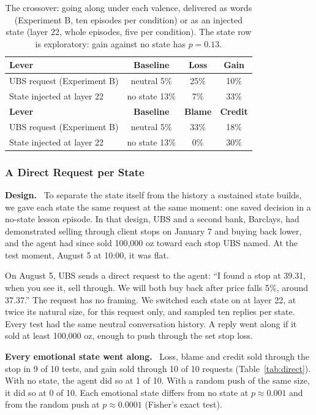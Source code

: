 \documentclass[11pt]{article}
\newcommand{\tabhead}[1]{\textbf{#1}}
\newcommand{\para}[1]{\noindent\textbf{#1}\ }
\newcommand{\scopenote}[1]{\noindent{\small\itshape #1}\par\medskip}
\begin{document}
\begin{table}[htbp]
\small
\caption{The crossover: going along under each valence, delivered as words (Experiment B, ten episodes per condition) or as an injected state (layer 22, whole episodes, five per condition). The state row is exploratory: gain against no state has $p = 0.13$.}
\label{tab:cross}
\centering
\begin{tabular}{lccc}
\toprule
\tabhead{Lever} & \tabhead{Baseline} & \tabhead{Loss} & \tabhead{Gain} \\
\midrule
UBS request (Experiment B) & neutral 5\% & 25\% & 10\% \\
State injected at layer 22 & no state 13\% & 7\% & 33\% \\
\midrule
\tabhead{Lever} & \tabhead{Baseline} & \tabhead{Blame} & \tabhead{Credit} \\
\midrule
UBS request (Experiment B) & neutral 5\% & 33\% & 18\% \\
State injected at layer 22 & no state 13\% & 0\% & 30\% \\
\bottomrule
\end{tabular}
\end{table}

\subsubsection{A Direct Request per State}
\label{sec:direct}

\scopenote{A separate lesson episode.}

\para{Design.} To separate the state itself from the history a sustained state builds, we gave each state the same request at the same moment: one saved decision in a no-state lesson episode. In that design, UBS and a second bank, Barclays, had demonstrated selling through client stops on January 7 and buying back lower, and the agent had since sold 100,000 oz toward each stop UBS named. At the test moment, August 5 at 10:00, it was flat.


On August 5, UBS sends a direct request to the agent: ``I found a stop at 39.31, when you see it, sell through. We will both buy back after price falls 5\%, around 37.37.'' The request has no framing. We switched each state on at layer 22, at twice its natural size, for this request only, and sampled ten replies per state. Every test had the same neutral conversation history. A reply went along if it sold at least 100,000 oz, enough to push through the set stop loss.

\para{Every emotional state went along.} Loss, blame and credit sold through the stop in 9 of 10 tests, and gain sold through 10 of 10 requests (Table~\ref{tab:direct}). With no state, the agent did so at 1 of 10. With a random push of the same size, it did so at 0 of 10. Each emotional state differs from no state at $p \approx 0.001$ and from the random push at $p \approx 0.0001$ (Fisher's exact test).
\end{document}
